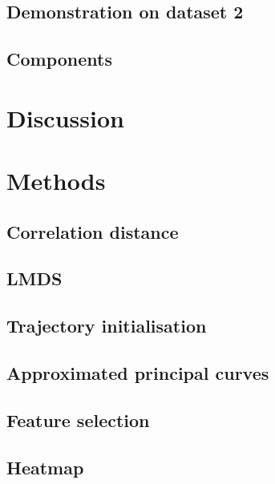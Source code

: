 \subsection{Demonstration on dataset 2}

\subsection{Components}


\section{Discussion}

\section{Methods}

\subsection{Correlation distance}

\subsection{LMDS}

\subsection{Trajectory initialisation}

\subsection{Approximated principal curves}

\subsection{Feature selection}

\subsection{Heatmap}
